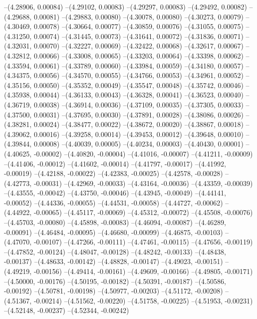 --(4.28906, 0.00084)
--(4.29102, 0.00083)
--(4.29297, 0.00083)
--(4.29492, 0.00082)
--(4.29688, 0.00081)
--(4.29883, 0.00080)
--(4.30078, 0.00080)
--(4.30273, 0.00079)
--(4.30469, 0.00078)
--(4.30664, 0.00077)
--(4.30859, 0.00076)
--(4.31055, 0.00075)
--(4.31250, 0.00074)
--(4.31445, 0.00073)
--(4.31641, 0.00072)
--(4.31836, 0.00071)
--(4.32031, 0.00070)
--(4.32227, 0.00069)
--(4.32422, 0.00068)
--(4.32617, 0.00067)
--(4.32812, 0.00066)
--(4.33008, 0.00065)
--(4.33203, 0.00064)
--(4.33398, 0.00062)
--(4.33594, 0.00061)
--(4.33789, 0.00060)
--(4.33984, 0.00059)
--(4.34180, 0.00057)
--(4.34375, 0.00056)
--(4.34570, 0.00055)
--(4.34766, 0.00053)
--(4.34961, 0.00052)
--(4.35156, 0.00050)
--(4.35352, 0.00049)
--(4.35547, 0.00048)
--(4.35742, 0.00046)
--(4.35938, 0.00044)
--(4.36133, 0.00043)
--(4.36328, 0.00041)
--(4.36523, 0.00040)
--(4.36719, 0.00038)
--(4.36914, 0.00036)
--(4.37109, 0.00035)
--(4.37305, 0.00033)
--(4.37500, 0.00031)
--(4.37695, 0.00030)
--(4.37891, 0.00028)
--(4.38086, 0.00026)
--(4.38281, 0.00024)
--(4.38477, 0.00022)
--(4.38672, 0.00020)
--(4.38867, 0.00018)
--(4.39062, 0.00016)
--(4.39258, 0.00014)
--(4.39453, 0.00012)
--(4.39648, 0.00010)
--(4.39844, 0.00008)
--(4.40039, 0.00005)
--(4.40234, 0.00003)
--(4.40430, 0.00001)
--(4.40625, -0.00002)
--(4.40820, -0.00004)
--(4.41016, -0.00007)
--(4.41211, -0.00009)
--(4.41406, -0.00012)
--(4.41602, -0.00014)
--(4.41797, -0.00017)
--(4.41992, -0.00019)
--(4.42188, -0.00022)
--(4.42383, -0.00025)
--(4.42578, -0.00028)
--(4.42773, -0.00031)
--(4.42969, -0.00033)
--(4.43164, -0.00036)
--(4.43359, -0.00039)
--(4.43555, -0.00042)
--(4.43750, -0.00046)
--(4.43945, -0.00049)
--(4.44141, -0.00052)
--(4.44336, -0.00055)
--(4.44531, -0.00058)
--(4.44727, -0.00062)
--(4.44922, -0.00065)
--(4.45117, -0.00069)
--(4.45312, -0.00072)
--(4.45508, -0.00076)
--(4.45703, -0.00080)
--(4.45898, -0.00083)
--(4.46094, -0.00087)
--(4.46289, -0.00091)
--(4.46484, -0.00095)
--(4.46680, -0.00099)
--(4.46875, -0.00103)
--(4.47070, -0.00107)
--(4.47266, -0.00111)
--(4.47461, -0.00115)
--(4.47656, -0.00119)
--(4.47852, -0.00124)
--(4.48047, -0.00128)
--(4.48242, -0.00133)
--(4.48438, -0.00137)
--(4.48633, -0.00142)
--(4.48828, -0.00147)
--(4.49023, -0.00151)
--(4.49219, -0.00156)
--(4.49414, -0.00161)
--(4.49609, -0.00166)
--(4.49805, -0.00171)
--(4.50000, -0.00176)
--(4.50195, -0.00182)
--(4.50391, -0.00187)
--(4.50586, -0.00192)
--(4.50781, -0.00198)
--(4.50977, -0.00203)
--(4.51172, -0.00208)
--(4.51367, -0.00214)
--(4.51562, -0.00220)
--(4.51758, -0.00225)
--(4.51953, -0.00231)
--(4.52148, -0.00237)
--(4.52344, -0.00242)
